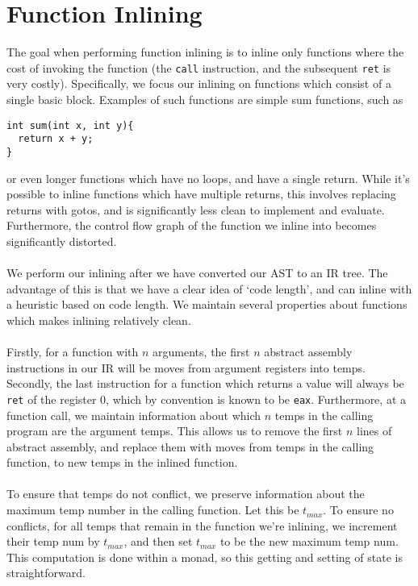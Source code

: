 \documentclass[11pt]{article}
\begin{document}
\section{Function Inlining}
The goal when performing function inlining is to inline only functions where the cost of 
invoking the function (the \verb+call+ instruction, and the subsequent \verb+ret+ is very 
costly). Specifically, we focus our inlining on functions which consist of a single basic 
block. Examples of such functions are simple sum functions, such as 
\begin{verbatim}
int sum(int x, int y){
  return x + y;
}
\end{verbatim}
or even longer functions which have no loops, and have a single return. While it's possible to inline
functions which have multiple returns, this involves replacing returns with gotos, and is 
significantly less clean to implement and evaluate. Furthermore, the control flow graph of 
the function we inline into becomes significantly distorted. \\
\\
We perform our inlining after we have converted our AST to an IR tree. The advantage of this is that
we have a clear idea of `code length', and can inline with a heuristic based on code length. We maintain
several properties about functions which makes inlining relatively clean. \\
\\
Firstly, for a function with $n$ arguments, the first $n$ abstract assembly instructions in our IR will 
be moves from argument registers into temps. Secondly, the last instruction for a function which returns a 
value will always be \verb+ret+ of the register 0, which by convention is known to be \verb+eax+. Furthermore,
at a function call, we maintain information about which $n$ temps in the calling program are the argument 
temps. This allows us to remove the first $n$ lines of abstract assembly, and replace them with moves from 
temps in the calling function, to new temps in the inlined function.\\
\\
To ensure that temps do not conflict, we preserve information about the maximum temp number in the calling
function. Let this be $t_{max}$. To ensure no conflicts, for all temps that remain in the function we're 
inlining, we increment their temp num by $t_{max}$, and then set $t_{max}$ to be the new maximum temp num. 
This computation is done within a monad, so this getting and setting of state is straightforward.\\
\end{document}
